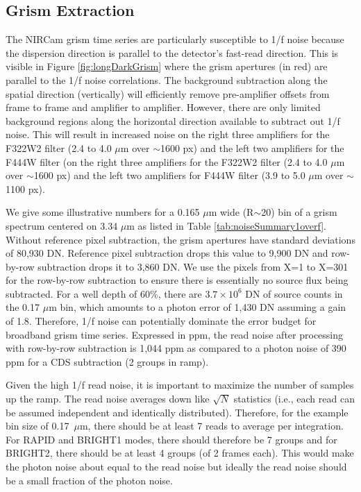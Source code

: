 \documentclass[]{aastex62}
\begin{document}
\subsection{Grism Extraction}\label{sec:GrismDarkExtraction}

The NIRCam grism time series are particularly susceptible to 1/f noise because the dispersion direction is parallel to the detector's fast-read direction.
This is visible in Figure \ref{fig:longDarkGrism} where the grism apertures (in red) are parallel to the 1/f noise correlations.
The background subtraction along the spatial direction (vertically) will efficiently remove pre-amplifier offsets from frame to frame and amplifier to amplifier.
However, there are only limited background regions along the horizontal direction available to subtract out 1/f noise.
This will result in increased noise on the right three amplifiers for the F322W2 filter (2.4 to 4.0 $\mu$m over $\sim$1600 px) and the left two amplifiers for the F444W filter (on the right three amplifiers for the F322W2 filter (2.4 to 4.0 $\mu$m over $\sim$1600 px) and the left two amplifiers for F444W filter (3.9 to 5.0 $\mu$m over $\sim$1100 px).

We give some illustrative numbers for a 0.165 $\mu$m wide (R$\sim$20) bin of a grism spectrum centered on 3.34 $\mu$m as listed in Table \ref{tab:noiseSummary1overf}.
Without reference pixel subtraction, the grism apertures have standard deviations of 80,930 DN.
Reference pixel subtraction drops this value to 9,900 DN and row-by-row subtraction drops it to 3,860 DN.
We use the pixels from X=1 to X=301 for the row-by-row subtraction to ensure there is essentially no source flux being subtracted.
For a well depth of 60\%, there are $3.7 \times 10^6$ DN of source counts in the 0.17 $\mu$m bin, which amounts to a photon error of 1,430 DN assuming a gain of 1.8.
Therefore, 1/f noise can potentially dominate the error budget for broadband grism time series.
Expressed in ppm, the read noise after processing with row-by-row subtraction is 1,044 ppm as compared to a photon noise of 390 ppm for a CDS subtraction (2 groups in ramp).

Given the high 1/f read noise, it is important to maximize the number of samples up the ramp.
The read noise averages down like $\sqrt{N}$ statistics (i.e., each read can be assumed independent and identically distributed).
Therefore, for the example bin size of 0.17~$\mu$m, there should be at least 7 reads to average per integration.
For RAPID and BRIGHT1 modes, there should therefore be 7 groups and for BRIGHT2, there should be at least 4 groups (of 2 frames each).
This would make the photon noise about equal to the read noise but ideally the read noise should be a small fraction of the photon noise.
\end{document}
